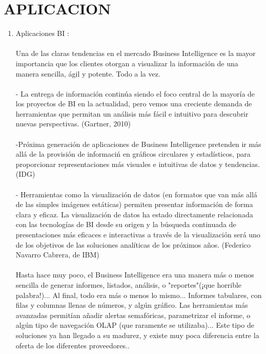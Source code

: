 \section{APLICACION} 
		
\begin{enumerate}[1.]

	\item Aplicaciones BI :
\\
\\
 Una de las claras tendencias en el mercado Business Intelligence es la mayor importancia que los clientes otorgan a visualizar la informaci\'on de una manera sencilla, \'agil y potente. Todo a la vez.
\\
\\
- La entrega de informaci\'on contin\'ua siendo el foco central de la mayor\'ia de los proyectos de BI en la actualidad, pero vemos una creciente demanda de herramientas que permitan un an\'alisis más fácil e intuitivo para descubrir nuevas perspectivas. (Gartner, 2010)
\\
\\
-Pr\'oxima generaci\'on de aplicaciones de Business Intelligence pretenden ir más all\'a de la provisi\'on de informaci\'n en gr\'aficos circulares y estad\'isticos, para proporcionar representaciones m\'as visuales e intuitivas de datos y tendencias. (IDG)
\\
\\
- Herramientas como la visualizaci\'on de datos (en formatos que van m\'as all\'a de las simples im\'agenes est\'aticas) permiten presentar informaci\'on de forma clara y eficaz. La visualizaci\'on de datos ha estado directamente relacionada con las tecnolog\'ias de BI desde su origen y la b\'usqueda continuada de presentaciones m\'as eficaces e interactivas a trav\'es de la visualizaci\'on ser\'a uno de los objetivos de las soluciones anal\'iticas de los pr\'oximos años. (Federico Navarro Cabrera, de IBM)
\\
\\
Hasta hace muy poco, el Business Intelligence era una manera m\'as o menos sencilla de generar informes, listados, an\'alisis, o "reportes"(¡que horrible palabra!)... Al final, todo era m\'as o menos lo mismo... Informes tabulares, con filas y columnas llenas de n\'umeros, y alg\'un gr\'afico. Las herramientas m\'as avanzadas permit\'ian añadir alertas semaf\'oricas, parametrizar el informe, o alg\'un tipo de navegaci\'on OLAP (que raramente se utilizaba)... Este tipo de soluciones ya han llegado a su madurez, y existe muy poca diferencia entre la oferta de los diferentes proveedores..

\end{enumerate}
